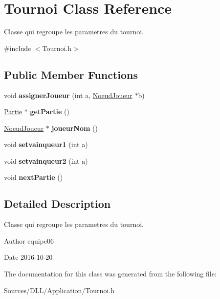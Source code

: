 \hypertarget{class_tournoi}{}\section{Tournoi Class Reference}
\label{class_tournoi}


Classe qui regroupe les parametres du tournoi.  




{\ttfamily \#include $<$Tournoi.\+h$>$}

\subsection*{Public Member Functions}
\begin{DoxyCompactItemize}
\item 
\hypertarget{class_tournoi_aef3539df119116b9bd69feff6c1e0c80}{}\label{class_tournoi_aef3539df119116b9bd69feff6c1e0c80} 
void {\bfseries assigner\+Joueur} (int a, \hyperlink{class_noeud_joueur}{Noeud\+Joueur} $\ast$b)
\item 
\hypertarget{class_tournoi_a565249eb997c83e8d34ddacd1880c40f}{}\label{class_tournoi_a565249eb997c83e8d34ddacd1880c40f} 
\hyperlink{class_partie}{Partie} $\ast$ {\bfseries get\+Partie} ()
\item 
\hypertarget{class_tournoi_aaa193cf85c395c4f0d5afac3b0ee2f98}{}\label{class_tournoi_aaa193cf85c395c4f0d5afac3b0ee2f98} 
\hyperlink{class_noeud_joueur}{Noeud\+Joueur} $\ast$ {\bfseries joueur\+Nom} ()
\item 
\hypertarget{class_tournoi_aae35120bbe6d6ffc186e7223c642dacc}{}\label{class_tournoi_aae35120bbe6d6ffc186e7223c642dacc} 
void {\bfseries setvainqueur1} (int a)
\item 
\hypertarget{class_tournoi_a69f37f76eefbfdead4ebbc38eb496ef0}{}\label{class_tournoi_a69f37f76eefbfdead4ebbc38eb496ef0} 
void {\bfseries setvainqueur2} (int a)
\item 
\hypertarget{class_tournoi_a25c9d2157e95ab68b2abf07c15e00f09}{}\label{class_tournoi_a25c9d2157e95ab68b2abf07c15e00f09} 
void {\bfseries next\+Partie} ()
\end{DoxyCompactItemize}


\subsection{Detailed Description}
Classe qui regroupe les parametres du tournoi. 

\begin{DoxyAuthor}{Author}
equipe06 
\end{DoxyAuthor}
\begin{DoxyDate}{Date}
2016-\/10-\/20 
\end{DoxyDate}


The documentation for this class was generated from the following file\+:\begin{DoxyCompactItemize}
\item 
Sources/\+D\+L\+L/\+Application/Tournoi.\+h\end{DoxyCompactItemize}

